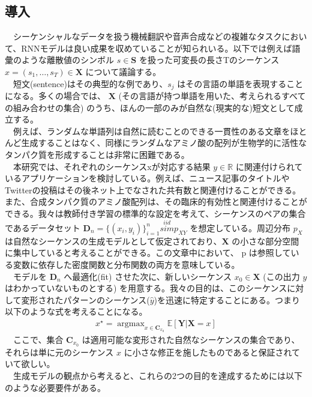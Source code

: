 \documentclass{scrartcl}
\DeclareMathOperator*{\argmax}{argmax}
\begin{document}
\subsection{導入}
\label{sec:orgab0758f}
　シーケンシャルなデータを扱う機械翻訳や音声合成などの複雑なタスクにおいて、RNNモデルは良い成果を収めていることが知られいる。以下では例えば語彙のような離散値のシンボル \(s\in \bm{S}\) を扱った可変長の長さTのシーケンス \(x = (s_1, \dots , s_T) \in \bm{X}\) について議論する。\\
　短文(sentence)はその典型的な例であり、\(s_j\) はその言語の単語を表現することになる。多くの場合では、  \(\bm{X}\) (その言語が持つ単語を用いた、考えられるすべての組み合わせの集合) のうち、ほんの一部のみが自然な(現実的な)短文として成立する。\\
　例えば、ランダムな単語列は自然に読むことのできる一貫性のある文章をほとんど生成することはなく、同様にランダムなアミノ酸の配列が生物学的に活性なタンパク質を形成することは非常に困難である。\\
　本研究では、それぞれのシーケンスxが対応する結果 \(y \in \mathbb{R}\) に関連付けられているアプリケーションを検討している。例えば、ニュース記事のタイトルやTwitterの投稿はその後ネット上でなされた共有数と関連付けることができる。また、合成タンパク質のアミノ酸配列は、その臨床的有効性と関連付けることができる。我々は教師付き学習の標準的な設定を考えて、シーケンスのペアの集合であるデータセット \(\bm{D}_n = \{(x_i, y_i)\}_{i=1}^{n} \overset{iid}{sim} p_{XY}\) を想定している。周辺分布 \(p_X\) は自然なシーケンスの生成モデルとして仮定されており、\(\bm{X}\) の小さな部分空間に集中していると考えることができる。この文章中において、 p は参照している変数に依存した密度関数と分布関数の両方を意味している。\\
　モデルを \(\bm{D}_n\) へ最適化(fit) させた次に、新しいシーケンス \(x_0 \in \bm{X}\) (この出力 \(y\) はわかっていないものとする) を用意する。我々の目的は、このシーケンスに対して変形されたパターンのシーケンス(\(\hat{y}\))を迅速に特定することにある。つまり以下のような式を考えることになる。\\
\begin{align}
x^{\star} = \argmax_{x\in\bm{C}_{x_0}} \mathbb{E}[\bm{Y} | \bm{X} = x]
\end{align}
　ここで、集合 \(\bm{C}_{x_0}\) は適用可能な変形された自然なシーケンスの集合であり、それらは単に元のシーケンス \(x\) に小さな修正を施したものであると保証されていて欲しい。\\
　生成モデルの観点から考えると、これらの2つの目的を達成するためには以下のような必要要件がある。\\
\end{document}
